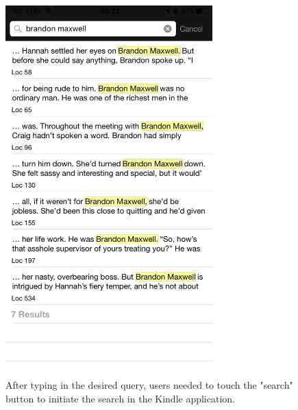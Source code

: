 \documentclass[journal, a4paper]{IEEEtran}
\begin{document}
    \begin{figure}[!hbt]
		\begin{center}
		\includegraphics[width=8cm]{kindleSearch2}
		\caption{After typing in the desired query, users needed to touch the "search" button to initiate the search in the Kindle application.}
		\label{fig:kindleSearch2}
		\end{center}
	\end{figure}
    
\end{document}
